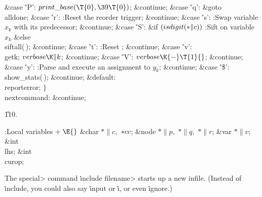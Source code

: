 \4\&{case} \.{'P'}:\5
${}\\{print\_base}(\T{0},\39\T{0}){}$;\5
\&{continue};\6
\4\&{case} \.{'q'}:\5
\&{goto} \\{alldone};\6
\4\&{case} \.{'r'}:\5
:Reset the reorder trigger\X;\5
\&{continue};\6
\4\&{case} \.{'s'}:\5
:Swap variable $x_k$ with its predecessor\X;\5
\&{continue};\6
\4\&{case} \.{'S'}:\6
\&{if} ${}(\\{isdigit}({*}\|c)){}$\1\5
:Sift on variable $x_k$\X\2\6
\&{else}\1\5
\\{siftall}(\,);\5
\2\&{continue};\6
\4\&{case} \.{'t'}:\5
:Reset \X;\5
\&{continue};\6
\4\&{case} \.{'v'}:\5
\\{getk};\5
${}\\{verbose}\K\|k{}$;\5
\&{continue};\6
\4\&{case} \.{'V'}:\5
${}\\{verbose}\K{-}\T{1}{}$;\5
\&{continue};\6
\4\&{case} \.{'y'}:\5
:Parse and execute an assignment to $y_k$\X;\5
\&{continue};\6
\4\&{case} \.{'\$'}:\5
\\{show\_stats}(\,);\5
\&{continue};\6
\4\&{default}:\5
\\{reporterror};\6
\4${}\}{}$\2\6
\4\\{nextcommand}:\5
\&{continue};\par
\U110.\fi

\B{}:Local variables\X${}\mathrel+\E{}$\6
\&{char} ${}{*}\|c,{}$ ${}{*}\\{cc}{}$;\6
\&{node} ${}{*}\|p,{}$ ${}{*}\|q,{}$ ${}{*}\|r{}$;\6
\&{var} ${}{*}\|v{}$;\6
\&{int} \\{lhs};\6
\&{int} \\{curop};\par
\fi

The \<special> command \.{include} \<filename> starts up a new infile.
(Instead of \.{include}, you could also say \.{input} or \.i, or
even \.{ignore}.)

